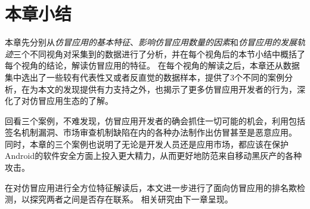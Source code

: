 \section{本章小结}
本章先分别从\emph{仿冒应用的基本特征}、\emph{影响仿冒应用数量的因素}和\emph{仿冒应用的发展轨迹}三个不同视角对采集到的数据进行了分析，并在每个视角后的本节小结中概括了每个视角的结论，解读仿冒应用的特征。
在每个视角的解读之后，本章还从数据集中选出了一些较有代表性又或者反直觉的数据样本，提供了3个不同的案例分析，在为本文的发现提供有力支持之外，也揭示了更多仿冒应用开发者的行为，深化了对仿冒应用生态的了解。

回看三个案例，不难发现，仿冒应用开发者的确会抓住一切可能的机会，利用包括签名机制漏洞、市场审查机制缺陷在内的各种办法制作出仿冒甚至是恶意应用。
同时，本章的三个案例也说明了无论是开发人员还是应用市场，都应该在保护Android的软件安全方面上投入更大精力，从而更好地防范来自移动黑灰产的各种攻击。

在对仿冒应用进行全方位特征解读后，本文进一步进行了面向仿冒应用的排名欺检测，以探究两者之间是否存在联系。
相关研究由下一章呈现。
